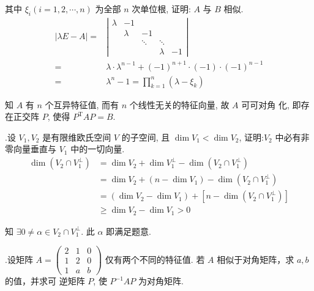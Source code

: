 \documentclass{article}
\begin{document}
其中 $\xi_{i}(i=1,2, \cdots, n)$ 为全部 $n$ 次单位根, 证明: $A$ 与 $B$ 相似.
$$
    \begin{aligned}
        |\lambda E-A|= & \left|\begin{array}{ccccc}
            \lambda & -1      &        &         &    \\
                    & \lambda & -1     &         &    \\
                    &         & \ddots & \ddots  &    \\
                    &         &        & \lambda & -1
        \end{array}\right|                                \\
        =              & \lambda \cdot    \lambda^{n-1} + (-1)^{n+1} \cdot (-1) \cdot (-1)^{n-1} \\
        =              & \lambda^{n}-1=\prod_{k=1}^{n}\left(\lambda-\xi_{k}\right)
    \end{aligned}
$$

知 $A$ 有 $n$ 个互异特征值, 而有 $n$ 个线性无关的特征向量, 故 $A$ 可可对角 化, 即存在正交阵 $P$, 使得 $P^{\mathrm{T}} A P=B .$

\vspace{1ex}
{.}设 $V_{1}, V_{2}$ 是有限维欧氏空间 $V$ 的子空间, 且 $\operatorname{dim} V_{1}<\operatorname{dim} V_{2}$, 证明:$V_{2}$ 中必有非零向量垂直与 $V_{1}$ 中的一切向量.
$$
    \begin{aligned}
        \operatorname{dim}\left(V_{2} \cap V_{1}^{\perp}\right) & =\operatorname{dim} V_{2}+\operatorname{dim} V_{1}^{\perp}-\operatorname{dim}\left(V_{2} \cap V_{1}^{\perp}\right)                     \\
                                                                & =\operatorname{dim} V_{2}+\left(n-\operatorname{dim} V_{1}\right)-\operatorname{dim}\left(V_{2} \cap V_{1}^{\perp}\right)              \\
                                                                & =\left(\operatorname{dim} V_{2}-\operatorname{dim} V_{1}\right)+\left[n-\operatorname{dim}\left(V_{2} \cap V_{1}^{\perp}\right)\right] \\
                                                                & \geq \operatorname{dim} V_{2}-\operatorname{dim} V_{1}>0
    \end{aligned}
$$

知 $\exists 0 \neq \alpha \in V_{2} \cap V_{1}^{\perp} .$ 此 $\alpha$ 即满足题意.

\vspace{1ex}
{.}设矩阵 $A=\left(\begin{array}{lll}2 & 1 & 0 \\ 1 & 2 & 0 \\ 1 & a & b\end{array}\right)$ 仅有两个不同的特征值. 若 $A$ 相似于对角矩阵，求 $a, b$ 的值，并求可
逆矩阵 $P$, 使 $P^{-1} A P$ 为对角矩阵.
\end{document}

